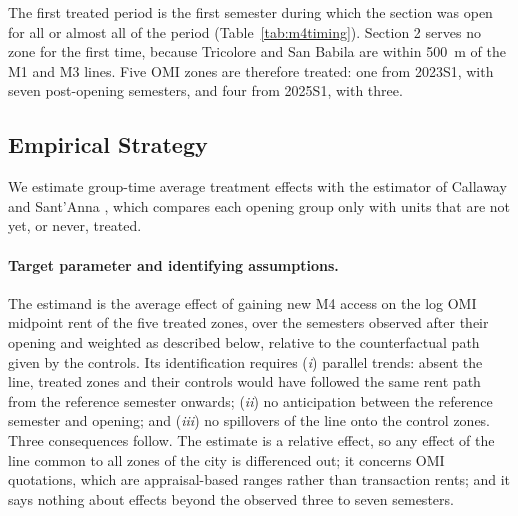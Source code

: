 The first treated period is the first semester during which the section was open for all or almost all of the period (Table~\ref{tab:m4timing}). Section 2 serves no zone for the first time, because Tricolore and San Babila are within 500~m of the M1 and M3 lines. Five OMI zones are therefore treated: one from 2023S1, with seven post-opening semesters, and four from 2025S1, with three.

\begin{table}[tbhp]
\centering
\caption{Opening dates and treated OMI zones (500~m catchment, 20\% exposure threshold)}
\label{tab:m4timing}
\end{table}

\subsection*{Empirical Strategy}

We estimate group-time average treatment effects with the estimator of Callaway and Sant'Anna \cite{callaway2021}, which compares each opening group only with units that are not yet, or never, treated.

\paragraph{Target parameter and identifying assumptions.} The estimand is the average effect of gaining new M4 access on the log OMI midpoint rent of the five treated zones, over the semesters observed after their opening and weighted as described below, relative to the counterfactual path given by the controls. Its identification requires (\textit{i}) parallel trends: absent the line, treated zones and their controls would have followed the same rent path from the reference semester onwards; (\textit{ii}) no anticipation between the reference semester and opening; and (\textit{iii}) no spillovers of the line onto the control zones. Three consequences follow. The estimate is a relative effect, so any effect of the line common to all zones of the city is differenced out; it concerns OMI quotations, which are appraisal-based ranges rather than transaction rents; and it says nothing about effects beyond the observed three to seven semesters.

